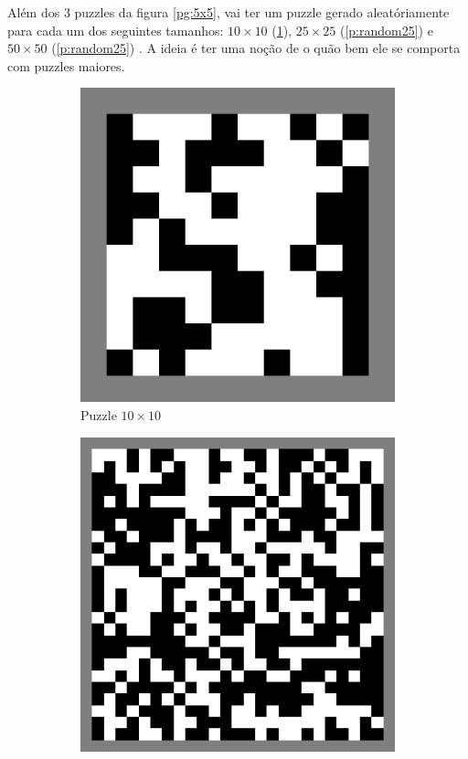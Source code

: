 \documentclass{article}
\begin{document}
Além dos 3 puzzles da figura \ref{pg:5x5},
vai ter um puzzle gerado aleatóriamente
para cada um dos seguintes tamanhos:
\(10 \times 10\) (\ref{p:random10}),
\(25 \times 25\) (\ref{p:random25}) e
\(50 \times 50\) (\ref{p:random25}) .
A ideia é ter uma noção de o quão bem
ele se comporta com puzzles maiores.

\begin{figure}[h]
    \centering
    \begin{subfigure}{0.3\textwidth}
        \centering
        \includegraphics[width=0.9\linewidth]{random10-border}
        \caption{Puzzle \(10 \times 10\)}
        \label{p:random10}
    \end{subfigure}
    \begin{subfigure}{0.3\textwidth}
        \centering
        \includegraphics[width=0.9\linewidth]{random25-border}

\end{subfigure}
\end{figure}
\end{document}
